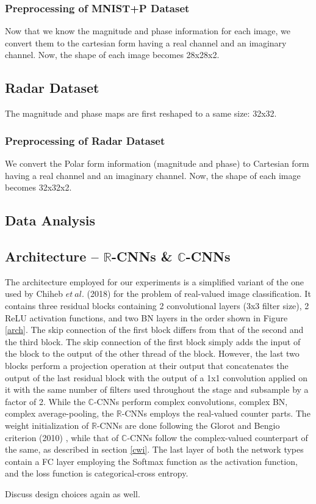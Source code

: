  
 \subsubsection{Preprocessing of MNIST+P Dataset}
 Now that we know the magnitude and phase information for each image, we convert them to the cartesian form having a real channel and an imaginary channel. Now, the shape of each image becomes 28x28x2.
 
     
 \subsection{Radar Dataset}
 The magnitude and phase maps are first reshaped to a same size: 32x32. 
 
 
 
 
 \subsubsection{Preprocessing of Radar Dataset}
 We convert the Polar form information (magnitude and phase) to Cartesian form having a real channel and an imaginary channel. Now, the shape of each image becomes 32x32x2.
 
 
 
 \subsection{Data Analysis}
 
 
 \subsection{Architecture -- $\mathbb{R}$-CNNs \& $\mathbb{C}$-CNNs}
 The architecture employed for our experiments is a simplified variant of the one used by Chiheb $et \ al.$ (2018) \cite{trabelsi2018deep} for the problem of real-valued image classification. It contains three residual blocks containing 2 convolutional layers (3x3 filter size), 2 ReLU activation functions, and two BN layers in the order shown in Figure \ref{arch}. The skip connection of the first block differs from that of the second and the third block. The skip connection of the first block simply adds the input of the block to the output of the other thread of the block. However, the last two blocks perform a projection operation at their output that concatenates the output of the last residual block with the output of a 1x1 convolution applied on it with the same number of filters used throughout the stage and subsample by a factor of 2. While the $\mathbb{C}$-CNNs perform complex convolutions, complex BN, complex average-pooling, the $\mathbb{R}$-CNNs employs the real-valued counter parts. The weight initialization of $\mathbb{R}$-CNNs are done following the Glorot and Bengio criterion (2010) \cite{glorot2010understanding}, while that of $\mathbb{C}$-CNNs follow the complex-valued counterpart of the same, as described in section \ref{cwi}. The last layer of both the network types contain a FC layer employing the Softmax function as the activation function, and the loss function is categorical-cross entropy.
 
 Discuss design choices again as well.
 
 
 
 
 
 
 
 
 
 
 
 
